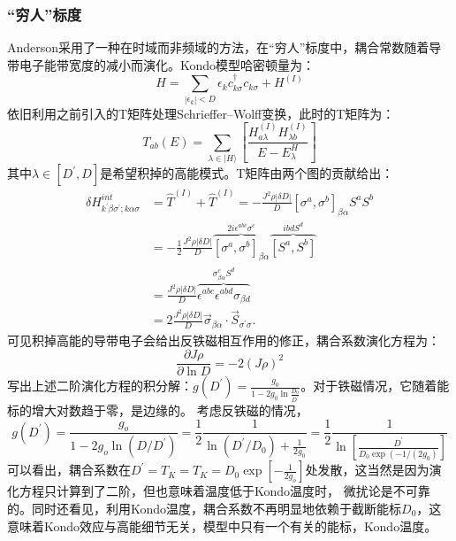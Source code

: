 \documentclass[10pt,openany]{book}
\theoremstyle{thmstyle} %
\theoremstyle{defstyle} %
\theoremstyle{prostyle} %
\begin{document}
\subsubsection*{“穷人”标度}
Anderson采用了一种在时域而非频域的方法，在“穷人”标度中，耦合常数随着导带电子能带宽度的减小而演化。Kondo模型哈密顿量为：
\begin{equation}
  H=\sum_{\left|\epsilon_k\right|<D} \epsilon_k c_{k \sigma}^{\dagger} c_{k \sigma}+H^{(I)}
\end{equation}
依旧利用之前引入的T矩阵处理Schrieffer–Wolff变换，此时的T矩阵为：
\begin{equation}
  T_{a b}(E)=\sum_{\lambda \in|H\rangle}\left[\frac{H_{a \lambda}^{(I)} H_{\lambda b}^{(I)}}{E-E_\lambda^H}\right]
\end{equation}
其中$ \lambda\in \left[D^{\prime}, D\right] $是希望积掉的高能模式。T矩阵由两个图的贡献给出：
\begin{equation}
  \begin{aligned}
    \delta H_{k^{\prime} \beta \sigma^{\prime} ; k \alpha \sigma}^{i n t} & =\hat{T}^{(I)}+\hat{T}^{(I)}=-\frac{J^2 \rho|\delta D|}{D}\left[\sigma^a, \sigma^b\right]_{\beta \alpha} S^a S^b \\
    & =-\frac{1}{2} \frac{J^2 \rho|\delta D|}{D} \overbrace{\left[\sigma^a, \sigma^b\right]_{\beta \alpha}}^{2 i \epsilon^{a b c} \sigma^c} \overbrace{\left[S^a, S^b\right]}^{i b d S^d} \\
    & =\frac{J^2 \rho|\delta D|}{D} \overbrace{\epsilon^{a b c} \epsilon^{a b d} \sigma_{\beta d}}^{\sigma_{\beta \alpha}^c S^d} \\
    & =2 \frac{J^2 \rho|\delta D|}{D} \vec{\sigma}_{\beta \alpha} \cdot \vec{S}_{\sigma^{\prime} \sigma} .
    \end{aligned}
\end{equation}
可见积掉高能的导带电子会给出反铁磁相互作用的修正，耦合系数演化方程为：
\begin{equation}
  \frac{\partial J \rho}{\partial \ln D}=-2(J \rho)^2
\end{equation}
写出上述二阶演化方程的积分解：$ g\left(D^{\prime}\right)=\frac{g_0}{1-2 g_0 \ln \frac{D_0}{D^{\prime}}} $。对于铁磁情况，它随着能标的增大对数趋于零，是边缘的。 考虑反铁磁的情况，
\begin{equation}
  g\left(D^{\prime}\right)=\frac{g_o}{1-2 g_o \ln \left(D / D^{\prime}\right)}=\frac{1}{2} \frac{1}{\ln \left(D^{\prime} / D_0\right)+\frac{1}{2 g_0}}=\frac{1}{2} \frac{1}{\ln \left[\frac{D^{\prime}}{D_0 \exp \left(-1 /\left(2 g_0\right)\right.}\right]}
\end{equation}
可以看出，耦合系数在$ D^{\prime}=T_K=T_K=D_0 \exp \left[-\frac{1}{2 g_o}\right] $处发散，这当然是因为演化方程只计算到了二阶，但也意味着温度低于Kondo温度时，
微扰论是不可靠的。同时还看见，利用Kondo温度，耦合系数不再明显地依赖于截断能标$ D_0 $，这意味着Kondo效应与高能细节无关，模型中只有一个有关的能标，Kondo温度。\\
\end{document}
